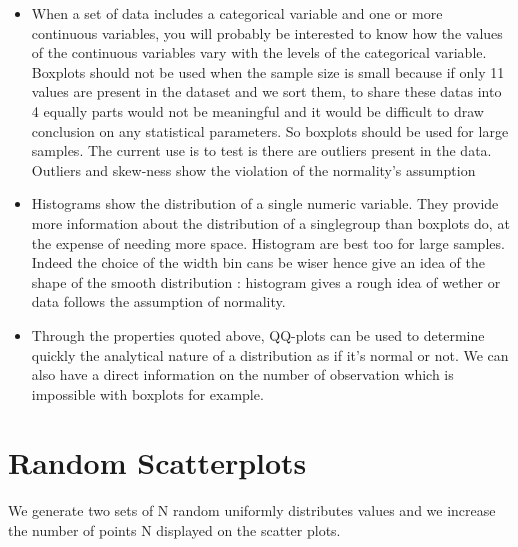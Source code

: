 \documentclass{article}
\begin{document}
\begin{itemize}
  \item When a set of data includes a categorical variable and one or more continuous variables, you will probably be interested to know how the values of the continuous variables vary with the levels of the categorical variable.
Boxplots should not be used when the sample size is small because if only 11 values are present in the dataset and we sort them, to share these datas into 4 equally parts would not be meaningful and it would be difficult to draw conclusion on any statistical parameters. So boxplots should be used for large samples. The current use is to test is there are outliers present in the data. Outliers and skew-ness show the violation of the normality's assumption
  \item Histograms show the distribution of a single numeric variable. They provide more information about the distribution of a singlegroup than boxplots do, at the expense of needing more space. Histogram are best too for large samples. Indeed the choice of the width bin cans be wiser hence give an idea of the shape of the smooth distribution : histogram gives a rough idea of wether or data follows the assumption of normality.
  \item Through the properties quoted above, QQ-plots can be used to determine quickly the analytical nature of a distribution as if it's normal or not. We can also have a direct information on the number of observation which is impossible with boxplots for example.
\end{itemize}


\section{Random Scatterplots}

We generate two sets of N random uniformly distributes values and we increase the number of points N displayed on the scatter plots.
\end{document}
